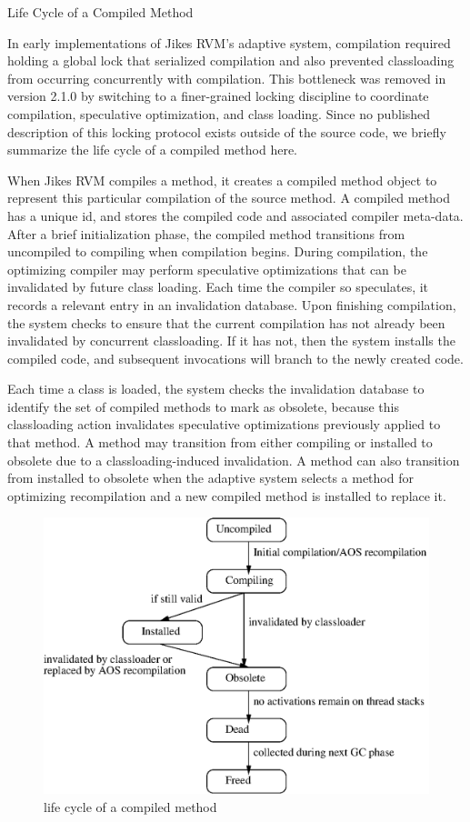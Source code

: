\begin{section}{Life Cycle of a Compiled Method}

In early implementations of Jikes RVM's adaptive system, compilation required holding a global lock that serialized compilation and also prevented classloading from occurring concurrently with compilation.  This bottleneck was removed in version 2.1.0 by switching to a finer-grained locking discipline to coordinate compilation, speculative optimization, and class loading. Since no published description of this locking protocol exists outside of the source code, we briefly summarize the life cycle of a compiled method here.

When Jikes RVM compiles a method, it creates a compiled method object to represent this particular compilation of the source method.  A compiled method has a unique id, and stores the compiled code and associated compiler meta-data. After a brief initialization phase, the compiled method transitions from uncompiled to compiling when compilation begins. During compilation, the optimizing compiler may perform speculative optimizations that can be invalidated by future class loading.  Each time the compiler so speculates, it records a relevant entry in an invalidation database.  Upon finishing compilation, the system checks to ensure that the current compilation has not already been  invalidated by concurrent classloading.  If it has not, then the system installs the compiled code, and subsequent  invocations will branch to the newly created code.

Each time a class is loaded, the system checks the invalidation database to identify the set of compiled methods to mark as obsolete,
because this classloading action invalidates speculative optimizations previously applied to that method.  A method may transition from either compiling or installed to obsolete due to a classloading-induced invalidation.  A method can also transition from installed to obsolete when the adaptive system selects a method for optimizing recompilation and a new compiled method is installed to replace it.

\begin{figure}
\centering
\includegraphics[width=\linewidth]{images/93224965.eps}
\caption{life cycle of a compiled method}
\end{figure}


\end{section}
